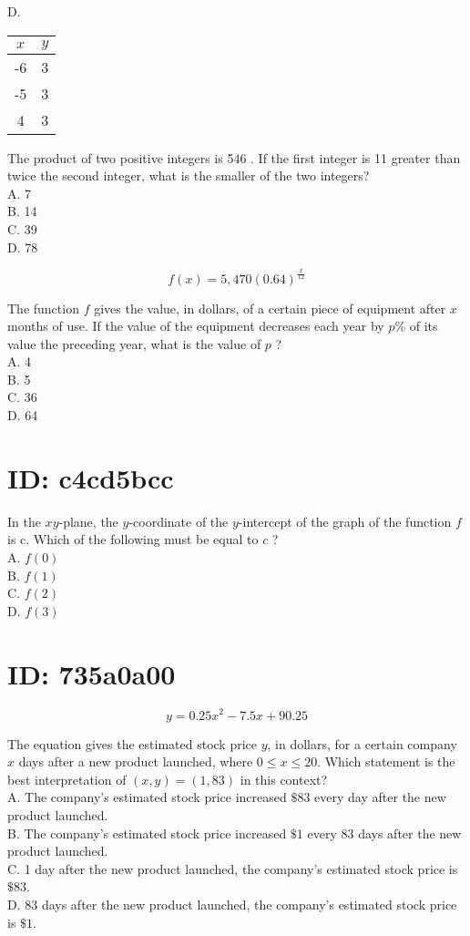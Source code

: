 D.

\begin{center}
\begin{tabular}{|c|c|}
\hline
$x$ & $y$ \\
\hline
-6 & 3 \\
\hline
-5 & 3 \\
\hline
4 & 3 \\
\hline
\end{tabular}
\end{center}

The product of two positive integers is 546 . If the first integer is 11 greater than twice the second integer, what is the smaller of the two integers?\\
A. 7\\
B. 14\\
C. 39\\
D. 78

$$
f(x)=5,470(0.64)^{\frac{x}{12}}
$$

The function $f$ gives the value, in dollars, of a certain piece of equipment after $x$ months of use. If the value of the equipment decreases each year by $p \%$ of its value the preceding year, what is the value of $p$ ?\\
A. 4\\
B. 5\\
C. 36\\
D. 64

\section*{ID: c4cd5bcc}
In the $x y$-plane, the $y$-coordinate of the $y$-intercept of the graph of the function $f$ is c. Which of the following must be equal to $c$ ?\\
A. $f(0)$\\
B. $f(1)$\\
C. $f(2)$\\
D. $f(3)$

\section*{ID: 735a0a00}
$$
y=0.25 x^{2}-7.5 x+90.25
$$

The equation gives the estimated stock price $y$, in dollars, for a certain company $x$ days after a new product launched, where $0 \leq x \leq 20$. Which statement is the best interpretation of $(x, y)=(1,83)$ in this context?\\
A. The company's estimated stock price increased $\$ 83$ every day after the new product launched.\\
B. The company's estimated stock price increased $\$ 1$ every 83 days after the new product launched.\\
C. 1 day after the new product launched, the company's estimated stock price is $\$ 83$.\\
D. 83 days after the new product launched, the company's estimated stock price is $\$ 1$.

